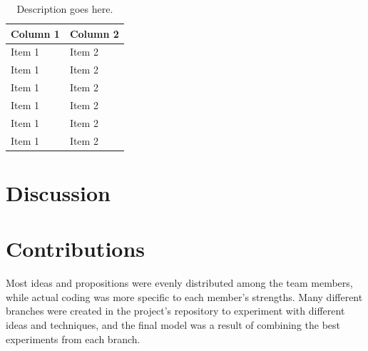 \documentclass[11pt]{article}
\begin{document}
\begin{multicols}{2}
      \begin{table}[H]
            \centering
            \setlength{\tabcolsep}{3pt}
            \caption{Description goes here.}
            \begin{tabularx}{\linewidth}{lY}
                \toprule
                Column 1 & Column 2 \\
                \midrule
                Item 1 & Item 2 \\
                Item 1 & Item 2 \\
                Item 1 & Item 2 \\
                Item 1 & Item 2 \\
                Item 1 & Item 2 \\
                Item 1 & Item 2 \\
                \bottomrule
            \end{tabularx}
            \label{tab:results}
        \end{table}

      \section{Discussion}

      \section{Contributions}

      Most ideas and propositions were evenly distributed among the team members, while actual coding was more specific to each member's strengths. Many different branches were created in the project's repository to experiment with different ideas and techniques, and the final model was a result of combining the best experiments from each branch.


\end{multicols}
\end{document}
